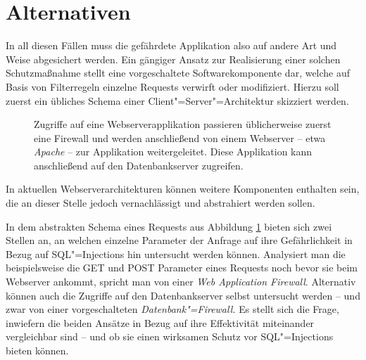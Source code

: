 \section{Alternativen}
In all diesen Fällen muss die gefährdete Applikation also auf andere Art und Weise abgesichert werden. Ein gängiger Ansatz zur Realisierung einer solchen Schutzmaßnahme stellt eine vorgeschaltete Softwarekomponente dar, welche auf Basis von Filterregeln einzelne Requests verwirft oder modifiziert. Hierzu soll zuerst ein übliches Schema einer Client"=Server"=Architektur skizziert werden.

\begin{figure}
\begin{margincap}
\centering
{}

\caption{Zugriffe auf eine Webserverapplikation passieren üblicherweise zuerst eine Firewall und werden anschließend von einem Webserver -- etwa \emph{Apache} -- zur Applikation weitergeleitet. Diese Applikation kann anschließend auf den Datenbankserver zugreifen.}
\label{img:server_arch}
\end{margincap}
\end{figure}


In aktuellen Webserverarchitekturen können weitere Komponenten enthalten sein, die an dieser Stelle jedoch vernachlässigt und abstrahiert werden sollen.

In dem abstrakten Schema eines Requests aus Abbildung \ref{img:server_arch} bieten sich zwei Stellen an, an welchen einzelne Parameter der Anfrage auf ihre Gefährlichkeit in Bezug auf SQL"=Injections hin untersucht werden können. Analysiert man die beispielsweise die GET und POST Parameter eines Requests noch bevor sie beim Webserver ankommt, spricht man von einer \emph{Web Application Firewall}. Alternativ können auch die Zugriffe auf den Datenbankserver selbst untersucht werden -- und zwar von einer vorgeschalteten \emph{Datenbank"=Firewall.} Es stellt sich die Frage, inwiefern die beiden Ansätze in Bezug auf ihre Effektivität miteinander vergleichbar sind -- und ob sie einen wirksamen Schutz vor SQL"=Injections bieten können.


